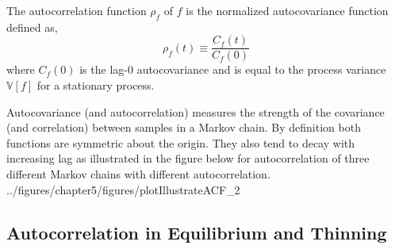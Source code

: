 The autocorrelation function $\rho_f$ of $f$ is the normalized autocovariance function defined as,
\begin{equation}
  \rho_f (t) \equiv \frac{C_f(t)}{C_f(0)}
\label{eq:ch5_autocorrelation}
\end{equation}
where $C_f(0)$ is the lag-$0$ autocovariance and is equal to the process variance $\mathbb{V}[f]$ for a stationary process.

Autocovariance (and autocorrelation) measures the strength of the covariance (and correlation) between samples in a Markov chain.
By definition both functions are symmetric about the origin.
They also tend to decay with increasing lag as illustrated in the figure below for autocorrelation of three different Markov chains with different autocorrelation.
{../figures/chapter5/figures/plotIllustrateACF_2}

\subsection[Autocorrelation in Equilibrium and Thinning]{Autocorrelation in Equilibrium and Thinning}\label{sub:bc_mcmc_thinning}

